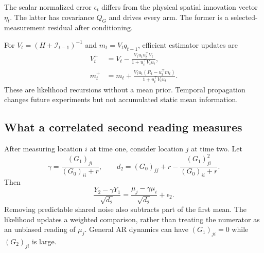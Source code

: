\documentclass[11pt]{article}
\begin{document}
The scalar normalized error $\epsilon_t$ differs from the physical spatial innovation vector $\eta_t$. The latter has covariance $Q_G$ and drives every arm. The former is a selected-measurement residual after conditioning.

For $V_t=(H+\mathcal I_{t-1})^{-1}$ and $m_t=V_tq_{t-1}$, efficient estimator updates are
\begin{align}
V_t^+&=V_t-\frac{V_tu_tu_t^\top V_t}{1+u_t^\top V_tu_t},\nonumber\\
m_t^+&=m_t+\frac{V_tu_t(R_t-u_t^\top m_t)}{1+u_t^\top V_tu_t}.
\label{eq:update}
\end{align}
These are likelihood recursions without a mean prior. Temporal propagation changes future experiments but not accumulated static mean information.

\subsection{What a correlated second reading measures}
After measuring location $i$ at time one, consider location $j$ at time two. Let
\[
\gamma=\frac{(G_1)_{ji}}{(G_0)_{ii}+r},\qquad
d_2=(G_0)_{jj}+r-\frac{(G_1)_{ji}^2}{(G_0)_{ii}+r}.
\]
Then
\[
\frac{Y_2-\gamma Y_1}{\sqrt{d_2}}
=\frac{\mu_j-\gamma\mu_i}{\sqrt{d_2}}+\epsilon_2.
\]
Removing predictable shared noise also subtracts part of the first mean. The likelihood updates a weighted comparison, rather than treating the numerator as an unbiased reading of $\mu_j$. General AR dynamics can have $(G_1)_{ji}=0$ while $(G_2)_{ji}$ is large.
\end{document}

